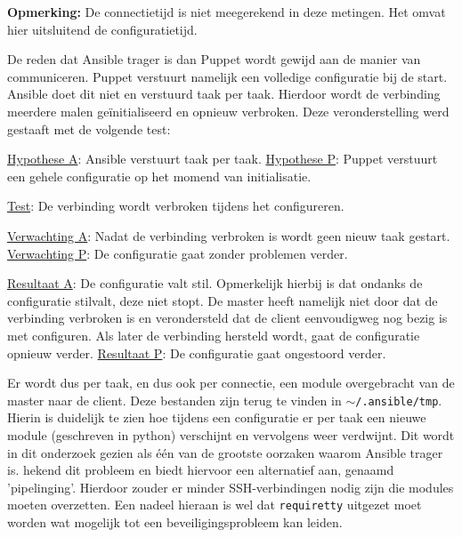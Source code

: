 \textbf{Opmerking:} De \gls{connectietijd} is niet meegerekend in deze metingen. Het omvat hier uitsluitend de \gls{configuratietijd}.

De reden dat Ansible trager is dan Puppet wordt gewijd aan de manier van communiceren. Puppet verstuurt namelijk een volledige configuratie bij de start. Ansible doet dit niet en verstuurd taak per taak. Hierdoor wordt de verbinding meerdere malen ge\"initialiseerd en opnieuw verbroken. Deze veronderstelling werd gestaaft met de volgende test:

\begin{addmargin}[2em]{0cm}
\underline{Hypothese A}: Ansible verstuurt taak per taak.\newline
\underline{Hypothese P}: Puppet verstuurt een gehele configuratie op het momend van initialisatie.

\underline{Test}: De verbinding wordt verbroken tijdens het configureren.

\underline{Verwachting A}: Nadat de verbinding verbroken is wordt geen nieuw taak gestart.\newline
\underline{Verwachting P}: De configuratie gaat zonder problemen verder.

\underline{Resultaat A}: De configuratie valt stil. Opmerkelijk hierbij is dat ondanks de configuratie stilvalt, deze niet stopt. De master heeft namelijk niet door dat de verbinding verbroken is en verondersteld dat de client eenvoudigweg nog bezig is met configuren. Als later de verbinding hersteld wordt, gaat de configuratie opnieuw verder.\newline
\underline{Resultaat P}: De configuratie gaat ongestoord verder.
\end{addmargin}

Er wordt dus per taak, en dus ook per connectie, een module overgebracht van de master naar de client. Deze bestanden zijn terug te vinden in \texttt{$\sim$/.ansible/tmp}. Hierin is duidelijk te zien hoe tijdens een configuratie er per taak een nieuwe module (geschreven in python) verschijnt en vervolgens weer verdwijnt. Dit wordt in dit onderzoek gezien als \'e\'en van de grootste oorzaken waarom Ansible trager is.  \textcite{AnsibleTuning} hekend dit probleem en biedt hiervoor een alternatief aan, genaamd 'pipelinging'. Hierdoor zouder er minder SSH-verbindingen nodig zijn die modules moeten overzetten. Een nadeel hieraan is wel dat \texttt{requiretty} uitgezet moet worden wat mogelijk tot een beveiligingsprobleem kan leiden.


